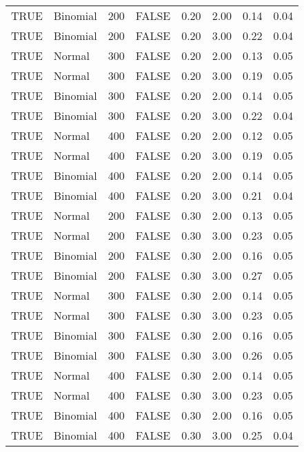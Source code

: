 \begin{longtable}{llrlrrrr}
  TRUE & Binomial & 200 & FALSE & 0.20 & 2.00 & 0.14 & 0.04 \\ 
  TRUE & Binomial & 200 & FALSE & 0.20 & 3.00 & 0.22 & 0.04 \\ 
  TRUE & Normal & 300 & FALSE & 0.20 & 2.00 & 0.13 & 0.05 \\ 
  TRUE & Normal & 300 & FALSE & 0.20 & 3.00 & 0.19 & 0.05 \\ 
  TRUE & Binomial & 300 & FALSE & 0.20 & 2.00 & 0.14 & 0.05 \\ 
  TRUE & Binomial & 300 & FALSE & 0.20 & 3.00 & 0.22 & 0.04 \\ 
  TRUE & Normal & 400 & FALSE & 0.20 & 2.00 & 0.12 & 0.05 \\ 
  TRUE & Normal & 400 & FALSE & 0.20 & 3.00 & 0.19 & 0.05 \\ 
  TRUE & Binomial & 400 & FALSE & 0.20 & 2.00 & 0.14 & 0.05 \\ 
  TRUE & Binomial & 400 & FALSE & 0.20 & 3.00 & 0.21 & 0.04 \\ 
  TRUE & Normal & 200 & FALSE & 0.30 & 2.00 & 0.13 & 0.05 \\ 
  TRUE & Normal & 200 & FALSE & 0.30 & 3.00 & 0.23 & 0.05 \\ 
  TRUE & Binomial & 200 & FALSE & 0.30 & 2.00 & 0.16 & 0.05 \\ 
  TRUE & Binomial & 200 & FALSE & 0.30 & 3.00 & 0.27 & 0.05 \\ 
  TRUE & Normal & 300 & FALSE & 0.30 & 2.00 & 0.14 & 0.05 \\ 
  TRUE & Normal & 300 & FALSE & 0.30 & 3.00 & 0.23 & 0.05 \\ 
  TRUE & Binomial & 300 & FALSE & 0.30 & 2.00 & 0.16 & 0.05 \\ 
  TRUE & Binomial & 300 & FALSE & 0.30 & 3.00 & 0.26 & 0.05 \\ 
  TRUE & Normal & 400 & FALSE & 0.30 & 2.00 & 0.14 & 0.05 \\ 
  TRUE & Normal & 400 & FALSE & 0.30 & 3.00 & 0.23 & 0.05 \\ 
  TRUE & Binomial & 400 & FALSE & 0.30 & 2.00 & 0.16 & 0.05 \\ 
  TRUE & Binomial & 400 & FALSE & 0.30 & 3.00 & 0.25 & 0.04 \\ 
   \hline
\hline
\end{longtable}
